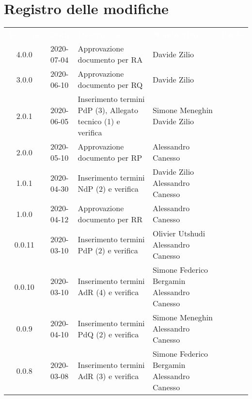 \section*{Registro delle modifiche}
{
	\centering
	\begin{longtable}{ c c  C{4cm} C{3cm} C{3.5cm} }
		\textcolor{white}{\textbf{Versione}} & \textcolor{white}{\textbf{Data}} & \textcolor{white}{\textbf{Descrizione}} & \textcolor{white}{\textbf{Nominativo}} & \textcolor{white}{\textbf{Ruolo}}\\	
		4.0.0 & 2020-07-04 & Approvazione documento per RA & Davide Zilio &\RdP{}\\	
		3.0.0 & 2020-06-10 & Approvazione documento per RQ & Davide Zilio &\RdP{}\\	
		2.0.1 & 2020-06-05 & Inserimento termini PdP (3), Allegato tecnico (1) e verifica & Simone Meneghin \newline Davide Zilio  &\ana{} \newline \ver{} \\
		2.0.0 & 2020-05-10 & Approvazione documento per RP & Alessandro Canesso &\RdP{}\\
		1.0.1 & 2020-04-30 & Inserimento termini NdP (2) e verifica & Davide Zilio \newline Alessandro Canesso &\ana{} \newline \ver{} \\
		1.0.0 & 2020-04-12 & Approvazione documento per RR& Alessandro Canesso &\RdP{}\\
		0.0.11 & 2020-03-10 & Inserimento termini PdP (2) e verifica & Olivier Utshudi \newline Alessandro Canesso &\ana{} \newline \ver{} \\
		0.0.10 & 2020-03-10 & Inserimento termini AdR (4) e verifica & Simone Federico Bergamin \newline Alessandro Canesso &\ana{} \newline \ver{} \\
		0.0.9 & 2020-04-10 & Inserimento termini PdQ (2) e verifica & Simone Meneghin \newline Alessandro Canesso &\ana{} \newline \ver{} \\
		0.0.8 & 2020-03-08 & Inserimento termini AdR (3) e verifica & Simone Federico Bergamin \newline Alessandro Canesso &\ana{} \newline \ver{} \\

\end{longtable}}
